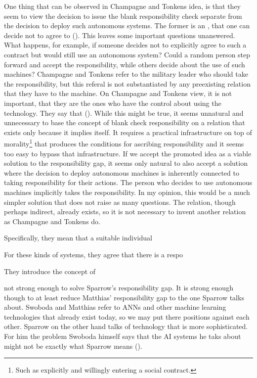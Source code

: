 \documentclass{article}
\newcounter{example}
\begin{document}
One thing that can be observed in Champagne and Tonkens idea, is that they seem
to view the decision to issue the blank responsibility check separate from
the decision to deploy such autonomous systems. The former is an , that one can decide not to agree to (\cite[p. 132-133,134]{champagne2015bridging}).
This leaves some important questions unanswered. What happens, for example, if
someone decides not to explicitly agree to such a contract but would still use
an autonomous system? Could a random person step forward and accept the
responsibility, while others decide about the use of such machines? Champagne
and Tonkens refer to the military leader who should take the responsibility, but
this referal is not substantiated by any preexisting relation that they have to
the machine. On Champagne and Tonkens view, it is not important, that they are
the ones who have the control about using the technology. They say that  (\cite[p.
127]{champagne2015bridging}). While this might be true, it seems unnatural and
unnecessary to base the concept of blank check responsibility on a relation that
exists only because it implies itself. It requires a practical infrastructure on top of
morality\footnote{Such as explicitly and willingly entering a social contract.}
that produces the conditions for ascribing responsibility and it seems too easy
to bypass that infrastructure. If we accept the promoted idea as a viable
solution to the responsibility gap, it seems only natural to also accept a
solution where the decision to deploy autonomous machines is inherently
connected to taking responsibility for their actions. The person who
decides to use autonomous machines implicitly takes the responsibility.
In my opinion, this would be a much simpler solution that does not raise as many
questions. The relation, though perhaps indirect, already exists, so it is not necessary
to invent another relation as Champagne and Tonkens do.

Specifically, they mean that a suitable individual 





\newpage
For these kinds of systems, they agree that there
is a respo

They introduce the concept of 

not strong enough to
solve Sparrow's responsibility gap. It is strong enough though to at least
reduce Matthias' responsibility gap to the one Sparrow talks about. Swoboda and
Matthias refer to ANNs and other machine learning technologies that already
exist today, so we may put there positions against each other. Sparrow on the
other hand talks of technology that is more sophisticated. For him the problem 
Swoboda himself says that the AI systems he taks about might not be exactly what
Sparrow means (\cite[p. 309]{swoboda2017autonomous}).
\end{document}
